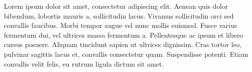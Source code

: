 \begin{abstractpage}

Lorem ipsum dolor sit amet, consectetur adipiscing elit. Aenean quis dolor bibendum, lobortis mauris a, sollicitudin lacus. Vivamus sollicitudin orci sed convallis faucibus. Morbi tempor augue vel nunc mollis euismod. Fusce varius fermentum dui, vel ultrices massa fermentum a. Pellentesque ac ipsum et libero cursus posuere. Aliquam tincidunt sapien ut ultrices dignissim. Cras tortor leo, pulvinar sagittis lacus et, convallis consectetur quam. Suspendisse potenti. Etiam convallis velit felis, eu rutrum ligula dictum sit amet.


\end{abstractpage}


